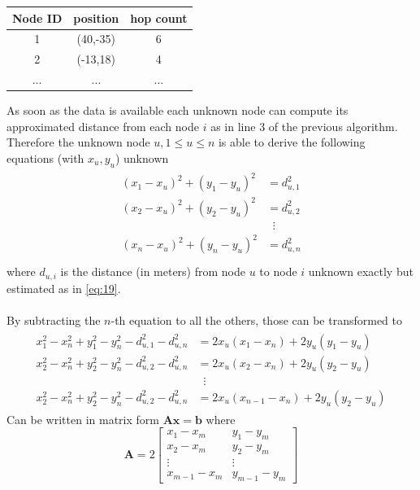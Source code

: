 \documentclass[12pt,twoside]{report}
\begin{document}
\begin{center}
\begin{tabular}{ |c|c|c| } 
 \hline
 Node ID & position & hop count \\ 
 \hline
 \hline
 1 & (40,-35) & 6 \\ 
 2 & (-13,18) & 4 \\
 $\hdots$ & $\hdots$ & $\hdots$\\
 \hline
\end{tabular}
\end{center}
As soon as the data is available each unknown node can compute its approximated distance from each node $i $ as in line $3$ of the previous algorithm. Therefore the unknown node $u, 1\leq u\leq n$ is able to derive the following equations (with $x_u,y_u$) unknown
\begin{align}
\begin{split} 
(x_1-x_u)^2+(y_1-y_u)^2&=d_{u,1}^2 \\ 
(x_2-x_u)^2+(y_2-y_u)^2&=d_{u,2}^2 \\ 
&\;\;\vdots\\
(x_n-x_u)^2+(y_n-y_u)^2&=d_{u,n}^2 \\
\end{split}
\end{align} 
where $d_{u,i}$ is the distance (in meters) from node $u$ to node $i$ unknown exactly but estimated as in \ref{eq:19}.
\\\\By subtracting the $n$-th equation to all the others, those can be transformed to
\begin{align}
\begin{split} 
x_1^2-x_n^2+y_1^2-y_n^2-d_{u,1}^2-d_{u,n}^2&=2x_u(x_1-x_n)+2y_u(y_1-y_u)\\ 
x_2^2-x_n^2+y_2^2-y_n^2-d_{u,2}^2-d_{u,n}^2&=2x_u(x_2-x_n)+2y_u(y_2-y_u)\\
&\;\;\vdots\\
x_2^2-x_n^2+y_2^2-y_n^2-d_{u,2}^2-d_{u,n}^2&=2x_u(x_{n-1}-x_n)+2y_u(y_2-y_u)
\end{split}
\end{align}
Can be written in matrix form $\mathbf{Ax}=\mathbf{b}$
where 
\begin{equation}
    \mathbf{A}=2\begin{bmatrix}
    x_1-x_m & y_1-y_m\\
    x_2-x_m & y_2-y_m\\
    \vdots & \vdots\\
    x_{m-1}-x_m & y_{m-1}-y_m
    \end{bmatrix}
\end{equation}
\end{document}
